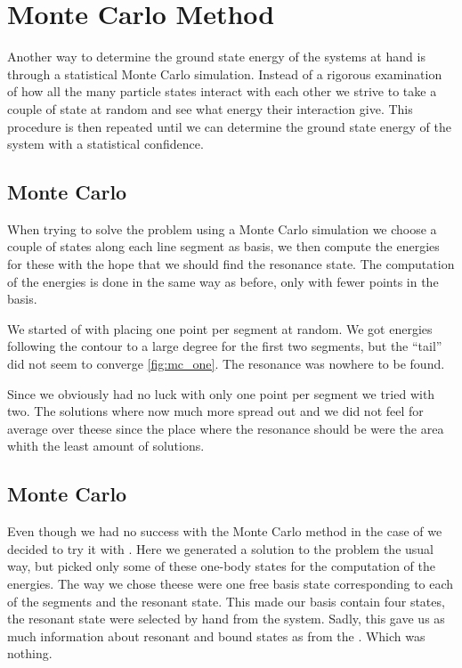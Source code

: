 \documentclass[../main/report.tex]{subfiles}
\begin{document}
\chapter{Monte Carlo Method}
\label{cha:monte_carlo}

Another way to determine the ground state energy of the systems at hand is through a statistical Monte Carlo simulation. 
Instead of a rigorous examination of how all the many particle states interact with each other we strive to take a couple of state at random and see what energy their interaction give. 
This procedure is then repeated until we can determine the ground state energy of the system with a statistical confidence.

\section{Monte Carlo }
When trying to solve the  problem using a Monte Carlo simulation we choose a couple of states along each line segment as basis, we then compute the energies for these with the hope that we should find the resonance state.
The computation of the energies is done in the same way as before, only with fewer points in the basis.

We started of with placing one point per segment at random.
We got energies following the contour to a large degree for the first two segments, but the ``tail'' did not seem to converge \cref{fig:mc_one}.
The resonance was nowhere to be found.

Since we obviously had no luck with only one point per segment we tried with two.
The solutions where now much more spread out and we did not feel for average over theese since the place where the resonance should be were the area whith the least amount of solutions.

\section{Monte Carlo }
Even though we had no success with the Monte Carlo method in the case of  we decided to try it with .
Here we generated a solution to the  problem the usual way, but picked only some of these one-body states for the computation of the energies.
The way we chose theese were one free basis state corresponding to each of the segments and the resonant state.
This made our basis contain four states, the resonant state were selected by hand from the  system.
Sadly, this gave us as much information about resonant and bound states as from the .
Which was nothing.
\end{document}
